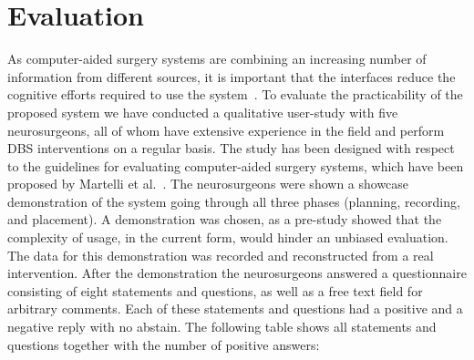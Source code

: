 \documentclass[review]{vgtc}                 %
\begin{document}


\section{Evaluation}\label{sec:evaluation}
As computer-aided surgery systems are combining an increasing number of information from different sources, it is important that the interfaces reduce the cognitive efforts required to use the system~\cite{Visarius1997,Martelli2003}. To evaluate the practicability of the proposed system we have conducted a qualitative user-study with five neurosurgeons, all of whom have extensive experience in the field and perform DBS interventions on a regular basis. The study has been designed with respect to the guidelines for evaluating computer-aided surgery systems, which have been proposed by Martelli et al.~\cite{Martelli2003}. The neurosurgeons were shown a showcase demonstration of the system going through all three phases (planning, recording, and placement). A demonstration was chosen, as a pre-study showed that the complexity of usage, in the current form, would hinder an unbiased evaluation. The data for this demonstration was recorded and reconstructed from a real intervention. After the demonstration the neurosurgeons answered a questionnaire consisting of eight statements and questions, as well as a free text field for arbitrary comments. Each of these statements and questions had a positive and a negative reply with no abstain. The following table shows all statements and questions together with the number of positive answers:

\end{document}
